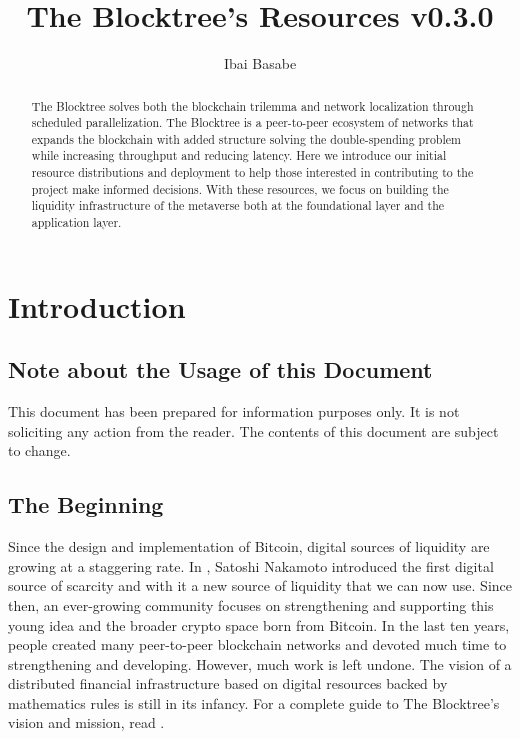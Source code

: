 \documentclass[12pt]{article}
\title{The Blocktree's Resources v0.3.0}
\author{Ibai Basabe}
\date{}           %
\begin{document}
\pagecolor{white}

\maketitle

\begin{abstract}

The Blocktree solves both the blockchain trilemma and network localization through scheduled parallelization. The Blocktree is a peer-to-peer ecosystem of networks that expands the blockchain with added structure solving the double-spending problem while increasing throughput and reducing latency. Here we introduce our initial resource distributions and deployment to help those interested in contributing to the project make informed decisions. With these resources, we focus on building the liquidity infrastructure of the metaverse both at the foundational layer and the application layer. 

\end{abstract}

\tableofcontents
\newpage



\section{Introduction}

\subsection{Note about the Usage of this Document}

This document has been prepared for information purposes only. It is not soliciting any action from the reader. The contents of this document are subject to change.

\subsection{The Beginning }

Since the design and implementation of Bitcoin, digital sources of liquidity are growing at a staggering rate. In \cite{N}, Satoshi Nakamoto introduced the first digital source of scarcity and with it a new source of liquidity that we can now use. Since then, an ever-growing community focuses on strengthening and supporting this young idea and the broader crypto space born from Bitcoin. In the last ten years, people created many peer-to-peer blockchain networks and devoted much time to strengthening and developing. However, much work is left undone. The vision of a distributed financial infrastructure based on digital resources backed by mathematics rules is still in its infancy. For a complete guide to The Blocktree's vision and mission, read \cite{B}.
\end{document}
